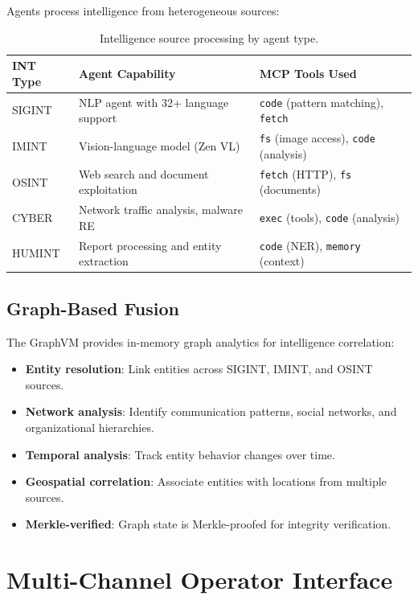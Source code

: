 \documentclass[11pt,letterpaper]{article}
\begin{document}
Agents process intelligence from heterogeneous sources:

\begin{table}[H]
\centering
\begin{tabular}{@{}llp{4.5cm}@{}}
\toprule
\textbf{INT Type} & \textbf{Agent Capability} & \textbf{MCP Tools Used} \\
\midrule
SIGINT & NLP agent with 32+ language support & \texttt{code} (pattern matching), \texttt{fetch} \\
IMINT & Vision-language model (Zen VL) & \texttt{fs} (image access), \texttt{code} (analysis) \\
OSINT & Web search and document exploitation & \texttt{fetch} (HTTP), \texttt{fs} (documents) \\
CYBER & Network traffic analysis, malware RE & \texttt{exec} (tools), \texttt{code} (analysis) \\
HUMINT & Report processing and entity extraction & \texttt{code} (NER), \texttt{memory} (context) \\
\bottomrule
\end{tabular}
\caption{Intelligence source processing by agent type.}
\label{tab:intel-sources}
\end{table}

\subsection{Graph-Based Fusion}

The GraphVM provides in-memory graph analytics for intelligence correlation:

\begin{itemize}
\item \textbf{Entity resolution}: Link entities across SIGINT, IMINT, and OSINT sources.
\item \textbf{Network analysis}: Identify communication patterns, social networks, and organizational hierarchies.
\item \textbf{Temporal analysis}: Track entity behavior changes over time.
\item \textbf{Geospatial correlation}: Associate entities with locations from multiple sources.
\item \textbf{Merkle-verified}: Graph state is Merkle-proofed for integrity verification.
\end{itemize}

\section{Multi-Channel Operator Interface}
\end{document}
